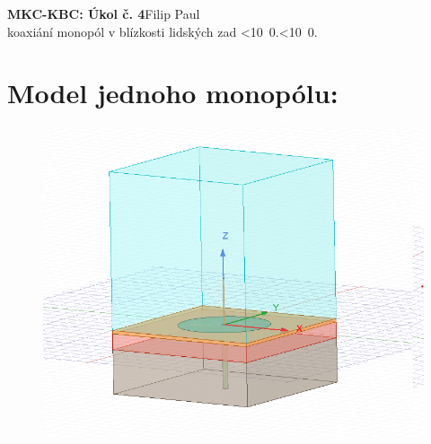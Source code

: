 \documentclass[10pt, a4paper]{article}%
\def\mydate{\leavevmode\hbox{\twodigits\day.\twodigits\month.\the\year}}
\def\twodigits#1{\ifnum#1<10 0\fi\the#1}
\begin{document}
\begin{flushleft}%
	\textbf{\Large{MKC-KBC: Úkol č. 4}}\hfill Filip Paul\\
	\large{koaxiání monopól v blízkosti lidských zad \hfill\mydate}
\end{flushleft}

\section{\Large Model jednoho monopólu:}
\begin{figure}[ht!]
	\centering
	\includegraphics[height = 0.3\textheight]{single_model.png}
\end{figure}
\end{document}
